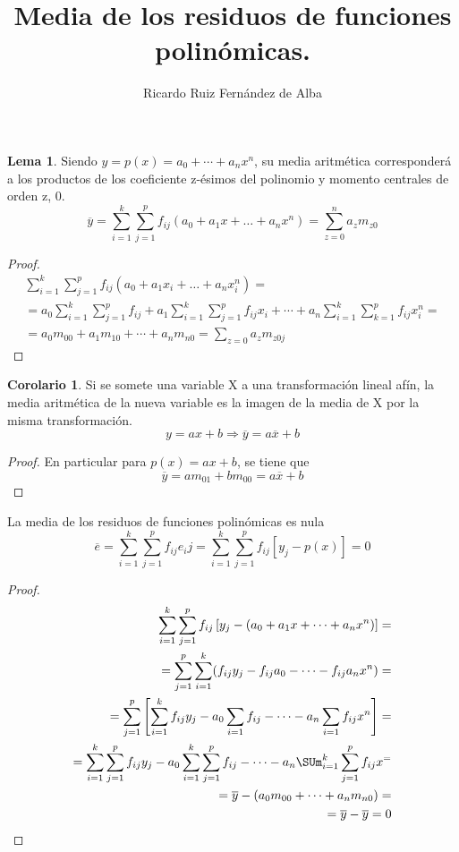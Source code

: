 \documentclass[a4paper , 11pt, spanish ]{article}
\title{Media de los residuos de funciones polinómicas.}
\author{Ricardo Ruiz Fernández de Alba}
\theoremstyle{definition}
\newtheorem{corollary}{Corolario}[theorem]
\newtheorem{lemma}[theorem]{Lema}
\begin{document}
\maketitle

\begin{lemma}
Siendo $y = p(x) = a_0 + \cdots + a_nx^n$, su media aritmética
corresponderá a los productos de los coeficiente z-ésimos del polinomio y
momento centrales de orden z, 0.
$$
\overline{y} = \sum_{i=1}^k\sum_{j=1}^p f_{ij} (a_0 + a_1x + \ldots + a_nx^n) =
\sum_{z=0}^n a_z m_{z0}
$$
\end{lemma}

\begin{proof}

\begin{align*}
\sum_{i=1}^k\sum_{j=1}^p f_{ij} (a_0 + a_1x_i + \ldots + a_nx_i^n) = \\
= a_0 \sum_{i=1}^k\sum_{j=1}^p f_{ij} + a_1 \sum_{i=1}^k \sum_{j=1}^p f_{ij}x_i
+ \cdots + a_n \sum_{i=1}^k \sum_{k=1}^p f_{ij}x_i^n = \\
= a_0 m_{00} + a_1 m_{10} + \cdots + a_n m_{n0} = \sum_{z=0} a_z m_{z0j}
\end{align*}

\end{proof}

\begin{corollary}
Si se somete una variable X a una transformación lineal afín, la media aritmética
de la nueva variable es la imagen de la media de X por la misma transformación.
$$
y = ax+b \Rightarrow  \overline{y} = a\overline{x} + b
$$
\end{corollary}
\begin{proof}
En particular para $p(x) = ax + b$, se tiene que
$$
\overline{y} = am_{01} + bm_{00} = a\overline{x} + b
$$
\end{proof}

\newpage

\begin{theorem}
La media de los residuos de funciones polinómicas es nula
$$
\overline{e} = \sum_{i=1}^k \sum_{j=1}^p f_{ij}e_ij =
\sum_{i=1}^k \sum_{j=1}^p  f_{ij} \left[y_j - p(x)\right]= 0
$$
\end{theorem}

\begin{proof}
\begin{align*}
\sum_{i=1}^k \sum_{j=1}^p  f_{ij}\left[y_j - (a_0 + a_1x + \cdots + a_nx^n )\right] = \\
 = \sum_{j=1}^p \sum_{i=1}^k (f_{ij}y_j -  f_{ij}a_0 -  \cdots - f_{ij}a_nx^n) = \\
 = \sum_{j=1}^p \left[\sum_{i=1}^k f_{ij}y_j - a_0\sum_{i=1} f_{ij} -
                      \cdots - a_n\sum_{i=1} f_{ij}x^n\right] = \\
 = \sum_{i=1}^k\sum_{j=1}^p f_{ij}y_j - a_0\sum_{i=1}^k\sum_{j=1}^p f_{ij} -
                      \cdots - a_n\SUm_{i=1}^k\sum_{j=1}^p f_{ij}x^ = \\
= \overline{y} -(a_0m_{00} + \cdots + a_nm_{n0}) = \\
= \overline{y} - \overline{y} = 0
\end{align*}
\end{proof}
\end{document}

